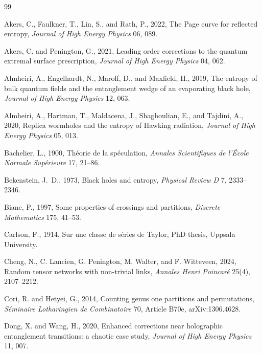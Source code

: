 \documentclass[11pt,letterpaper]{article}
\theoremstyle{plain}
\theoremstyle{definition}
\theoremstyle{remark}
\begin{document}
\begin{thebibliography}{99}

Akers, C., Faulkner, T., Lin, S., and Rath, P., 2022, The Page curve for reflected entropy, \textit{Journal of High Energy Physics} 06, 089.

Akers, C. and Penington, G., 2021, Leading order corrections to the quantum extremal surface prescription, \textit{Journal of High Energy Physics} 04, 062.


Almheiri, A., Engelhardt, N., Marolf, D., and Maxfield, H., 2019, The entropy of bulk quantum fields and the entanglement wedge of an evaporating black hole, \textit{Journal of High Energy Physics} 12, 063.

Almheiri, A., Hartman, T., Maldacena, J., Shaghoulian, E., and Tajdini, A., 2020, Replica wormholes and the entropy of Hawking radiation, \textit{Journal of High Energy Physics} 05, 013.

Bachelier, L., 1900, Th\'eorie de la sp\'eculation, \textit{Annales Scientifiques de l'\'Ecole Normale Sup\'erieure} 17, 21--86.


Bekenstein, J.~D., 1973, Black holes and entropy, \textit{Physical Review D} 7, 2333--2346.


Biane, P., 1997, Some properties of crossings and partitions, \textit{Discrete Mathematics} 175, 41--53.

Carlson, F., 1914, Sur une classe de s\'eries de Taylor, PhD thesis, Uppsala University.


Cheng, N., C. Lancien, G. Penington, M. Walter, and F. Witteveen, 2024, Random tensor networks with non-trivial links, \textit{Annales Henri Poincar\'{e}} 25(4), 2107--2212.

Cori, R. and Hetyei, G., 2014, Counting genus one partitions and permutations, \textit{S\'eminaire Lotharingien de Combinatoire} 70, Article B70e, arXiv:1306.4628.

Dong, X. and Wang, H., 2020, Enhanced corrections near holographic entanglement transitions: a chaotic case study, \textit{Journal of High Energy Physics} 11, 007.


\end{thebibliography}
\end{document}
